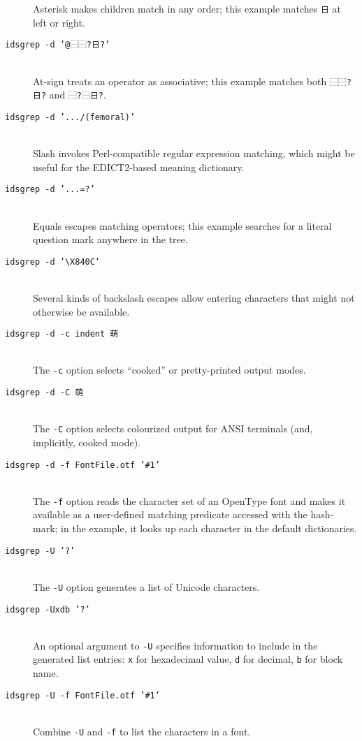 \documentclass[twocolumn]{report}
\begin{document}
\begin{description}
  Asterisk makes children match in any order; this example matches
  \texttt{日} at left or right.
\item[\texttt{idsgrep -d '@⿱⿱?日?'}]~\\
  At-sign treats an operator as associative; this example matches both
  \texttt{⿱⿱?日?} and \texttt{⿱?⿱日?}.
\item[\texttt{idsgrep -d '.../(femoral)'}]~\\
  Slash invokes Perl-compatible regular expression matching, which might be
  useful for the EDICT2-based meaning dictionary.
\item[\texttt{idsgrep -d '...=?'}]~\\
  Equals escapes matching operators; this example searches for a literal
  question mark anywhere in the tree.
\item[\texttt{idsgrep -d '\textbackslash X840C'}]~\\
  Several kinds of backslash escapes allow entering characters that might
  not otherwise be available.
\item[\texttt{idsgrep -d -c indent 萌}]~\\
  The \texttt{-c} option selects ``cooked'' or pretty-printed output modes.
\item[\texttt{idsgrep -d -C 萌}]~\\
  The \texttt{-C} option selects colourized output for ANSI terminals (and,
  implicitly, cooked mode).
\item[\texttt{idsgrep -d -f FontFile.otf '\#1'}]~\\
  The \texttt{-f} option reads the character set of an OpenType font
  and makes it available as a user-defined matching predicate accessed
  with the hash-mark; in the example, it looks up each character in the
  default dictionaries.
\item[\texttt{idsgrep -U '?'}]~\\
  The \texttt{-U} option generates a list of Unicode characters.
\item[\texttt{idsgrep -Uxdb '?'}]~\\
  An optional argument to \texttt{-U} specifies information to include
  in the generated list entries: \texttt{x} for hexadecimal
  value, \texttt{d} for decimal, \texttt{b} for block name.
\item[\texttt{idsgrep -U -f FontFile.otf '\#1'}]~\\
  Combine \texttt{-U} and \texttt{-f} to list the characters in a font.
\end{description}
\end{document}
